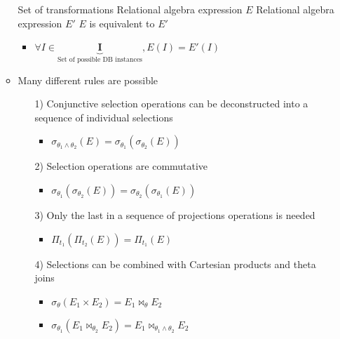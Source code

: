 \begin{itemize}
\begin{itemize}
\begin{itemize}
                \end{itemize}
             Set of transformations
             Relational algebra expression $E$
             Relational algebra expression $E'$
             $E$ is equivalent to $E'$
                \begin{itemize}
                    \item $\forall I \in \underbrace{\mathbf{I}}_{\text{Set of possible DB instances}}, E(I) = E'(I)$
                \end{itemize}
            \item Many different rules are possible
                \begin{itemize}
                    \item[1)] Conjunctive selection operations can be deconstructed into a sequence of individual selections
                        \begin{itemize}
                            \item $\sigma_{\theta_1 \wedge \theta_2}(E) = \sigma_{\theta_1}(\sigma_{\theta_2}(E))$
                        \end{itemize}
                    \item[2)] Selection operations are commutative
                        \begin{itemize}
                            \item $\sigma_{\theta_1}(\sigma_{\theta_2}(E)) = \sigma_{\theta_2}(\sigma_{\theta_1}(E))$
                        \end{itemize}
                    \item[3)] Only the last in a sequence of projections operations is needed
                        \begin{itemize}
                            \item $\Pi_{t_1}(\Pi_{t_2}(E)) = \Pi_{t_1}(E)$
                        \end{itemize}
                    \item[4)] Selections can be combined with Cartesian products and theta joins
                        \begin{itemize}
                            \item $\sigma_\theta(E_1 \times E_2) = E_1 \bowtie_\theta E_2$
                            \item $\sigma_{\theta_1}(E_1 \bowtie_{\theta_2} E_2) = E_1 \bowtie_{\theta_1 \wedge \theta_2} E_2$
                        \end{itemize}

\end{itemize}
\end{itemize}
\end{itemize}
